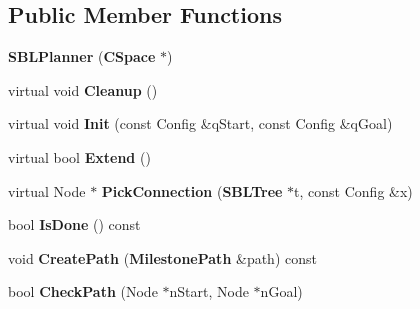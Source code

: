 \subsection*{Public Member Functions}
\begin{DoxyCompactItemize}
\item 
{\bfseries S\+B\+L\+Planner} ({\bf C\+Space} $\ast$)\label{classSBLPlanner_aba6b0ad96b263b92f5614a50faf51657}

\item 
virtual void {\bfseries Cleanup} ()\label{classSBLPlanner_a9c9151f0f8d42922446ce9f3e262a8bd}

\item 
virtual void {\bfseries Init} (const Config \&q\+Start, const Config \&q\+Goal)\label{classSBLPlanner_a6792ee71a70539e7ed11724e3d04343b}

\item 
virtual bool {\bfseries Extend} ()\label{classSBLPlanner_a3452dcaba7bd47077db65b34b44a7896}

\item 
virtual Node $\ast$ {\bfseries Pick\+Connection} ({\bf S\+B\+L\+Tree} $\ast$t, const Config \&x)\label{classSBLPlanner_ac025a72b7e61fc770bd68d5e5e9abc3d}

\item 
bool {\bfseries Is\+Done} () const \label{classSBLPlanner_a4fb16b752eb517eedea2d1f07c78f4de}

\item 
void {\bfseries Create\+Path} ({\bf Milestone\+Path} \&path) const \label{classSBLPlanner_ae7db86e45375469860f9e25c4bb1a1ee}

\item 
bool {\bfseries Check\+Path} (Node $\ast$n\+Start, Node $\ast$n\+Goal)\label{classSBLPlanner_aecba9031d2cdc33bd4377fce2c80bf96}

\end{DoxyCompactItemize}
